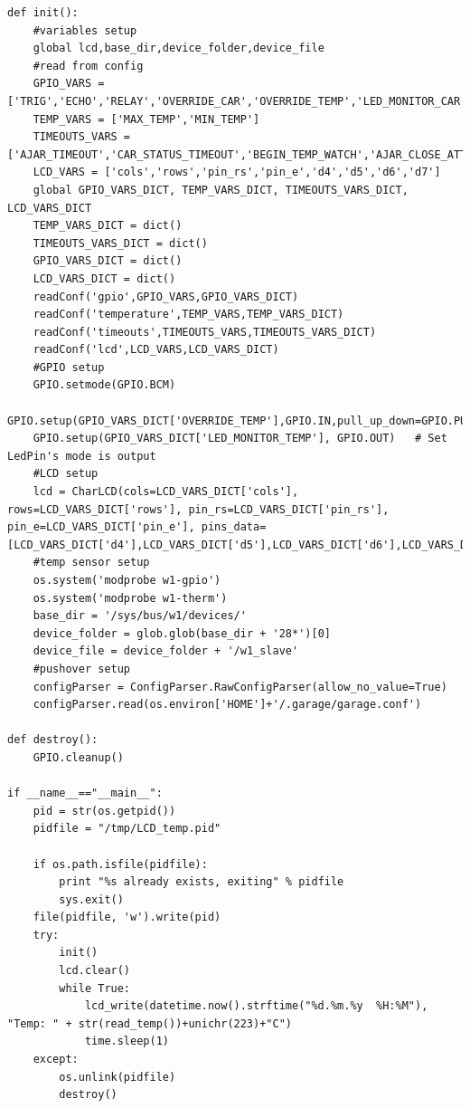 \documentclass[11pt]{article}
\begin{document}
\begin{verbatim}
def init():
    #variables setup
    global lcd,base_dir,device_folder,device_file
    #read from config
    GPIO_VARS = ['TRIG','ECHO','RELAY','OVERRIDE_CAR','OVERRIDE_TEMP','LED_MONITOR_CAR','LED_MONITOR_TEMP','REED_OPEN','REED_CLOSED']
    TEMP_VARS = ['MAX_TEMP','MIN_TEMP']
    TIMEOUTS_VARS = ['AJAR_TIMEOUT','CAR_STATUS_TIMEOUT','BEGIN_TEMP_WATCH','AJAR_CLOSE_ATTEMPTS']
    LCD_VARS = ['cols','rows','pin_rs','pin_e','d4','d5','d6','d7']
    global GPIO_VARS_DICT, TEMP_VARS_DICT, TIMEOUTS_VARS_DICT, LCD_VARS_DICT
    TEMP_VARS_DICT = dict()
    TIMEOUTS_VARS_DICT = dict()
    GPIO_VARS_DICT = dict()
    LCD_VARS_DICT = dict()
    readConf('gpio',GPIO_VARS,GPIO_VARS_DICT)
    readConf('temperature',TEMP_VARS,TEMP_VARS_DICT)
    readConf('timeouts',TIMEOUTS_VARS,TIMEOUTS_VARS_DICT)
    readConf('lcd',LCD_VARS,LCD_VARS_DICT)
    #GPIO setup
    GPIO.setmode(GPIO.BCM)
    GPIO.setup(GPIO_VARS_DICT['OVERRIDE_TEMP'],GPIO.IN,pull_up_down=GPIO.PUD_DOWN)
    GPIO.setup(GPIO_VARS_DICT['LED_MONITOR_TEMP'], GPIO.OUT)   # Set LedPin's mode is output
    #LCD setup
    lcd = CharLCD(cols=LCD_VARS_DICT['cols'], rows=LCD_VARS_DICT['rows'], pin_rs=LCD_VARS_DICT['pin_rs'], pin_e=LCD_VARS_DICT['pin_e'], pins_data=[LCD_VARS_DICT['d4'],LCD_VARS_DICT['d5'],LCD_VARS_DICT['d6'],LCD_VARS_DICT['d7']],numbering_mode=GPIO.BCM)
    #temp sensor setup
    os.system('modprobe w1-gpio')
    os.system('modprobe w1-therm')
    base_dir = '/sys/bus/w1/devices/'
    device_folder = glob.glob(base_dir + '28*')[0]
    device_file = device_folder + '/w1_slave'
    #pushover setup
    configParser = ConfigParser.RawConfigParser(allow_no_value=True)
    configParser.read(os.environ['HOME']+'/.garage/garage.conf')

def destroy():
    GPIO.cleanup()

if __name__=="__main__":
    pid = str(os.getpid())
    pidfile = "/tmp/LCD_temp.pid"

    if os.path.isfile(pidfile):
        print "%s already exists, exiting" % pidfile
        sys.exit()
    file(pidfile, 'w').write(pid)
    try:
        init()
        lcd.clear()
        while True:
        	lcd_write(datetime.now().strftime("%d.%m.%y  %H:%M"), "Temp: " + str(read_temp())+unichr(223)+"C")
        	time.sleep(1)
    except:
        os.unlink(pidfile)
        destroy()
\end{verbatim}
\end{document}
